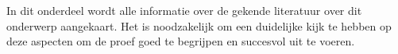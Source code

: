 \chapter{}%
\label{ch:stand-van-zaken}


In dit onderdeel wordt alle informatie over de gekende literatuur over dit onderwerp aangekaart. Het is noodzakelijk om een duidelijke kijk te hebben op deze aspecten om de proef goed te begrijpen en succesvol uit te voeren. 

